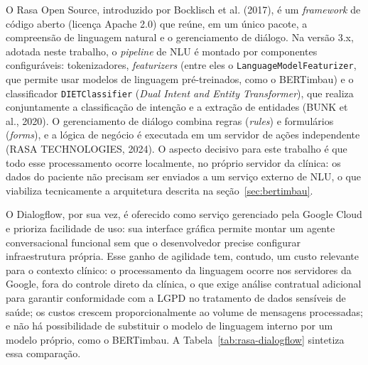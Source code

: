 \documentclass[12pt,a4paper]{extarticle}
\begin{document}
O Rasa Open Source, introduzido por Bocklisch et al. (2017), é um \textit{framework} de código aberto (licença Apache 2.0) que reúne, em um único pacote, a compreensão de linguagem natural e o gerenciamento de diálogo. Na versão 3.x, adotada neste trabalho, o \textit{pipeline} de NLU é montado por componentes configuráveis: tokenizadores, \textit{featurizers} (entre eles o \texttt{LanguageModel\allowbreak{}Featurizer}, que permite usar modelos de linguagem pré-treinados, como o BERTimbau) e o classificador \texttt{DIETClassifier} (\textit{Dual Intent and Entity Transformer}), que realiza conjuntamente a classificação de intenção e a extração de entidades (BUNK et al., 2020). O gerenciamento de diálogo combina regras (\textit{rules}) e formulários (\textit{forms}), e a lógica de negócio é executada em um servidor de ações independente (RASA TECHNOLOGIES, 2024). O aspecto decisivo para este trabalho é que todo esse processamento ocorre localmente, no próprio servidor da clínica: os dados do paciente não precisam ser enviados a um serviço externo de NLU, o que viabiliza tecnicamente a arquitetura descrita na seção~\ref{sec:bertimbau}.

O Dialogflow, por sua vez, é oferecido como serviço gerenciado pela Google Cloud e prioriza facilidade de uso: sua interface gráfica permite montar um agente conversacional funcional sem que o desenvolvedor precise configurar infraestrutura própria. Esse ganho de agilidade tem, contudo, um custo relevante para o contexto clínico: o processamento da linguagem ocorre nos servidores da Google, fora do controle direto da clínica, o que exige análise contratual adicional para garantir conformidade com a LGPD no tratamento de dados sensíveis de saúde; os custos crescem proporcionalmente ao volume de mensagens processadas; e não há possibilidade de substituir o modelo de linguagem interno por um modelo próprio, como o BERTimbau. A Tabela~\ref{tab:rasa-dialogflow} sintetiza essa comparação.
\end{document}
